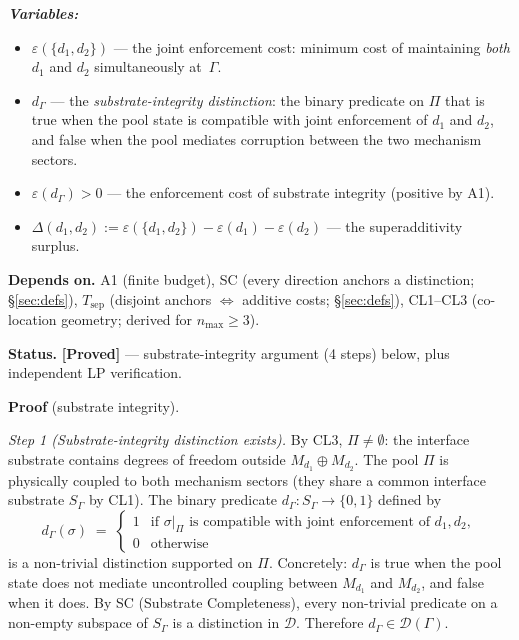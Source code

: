\documentclass[11pt]{article}
\theoremstyle{remark}
\newenvironment{varlist}{\begin{itemize}[nosep,leftmargin=2em]}{\end{itemize}}
\begin{document}
\begin{tcolorbox}[apfbox, title={$L_{\Delta}$ (Competition): Superadditivity from Substrate Integrity}]
\smallskip\noindent\textbf{\textit{Variables:}}
\begin{varlist}
\item $\varepsilon(\{d_1, d_2\})$ --- the joint enforcement cost: minimum cost of maintaining \emph{both} $d_1$ and $d_2$ simultaneously at~$\Gamma$.
\item $d_\Gamma$ --- the \emph{substrate-integrity distinction}: the binary predicate on $\Pi$ that is true when the pool state is compatible with joint enforcement of $d_1$ and $d_2$, and false when the pool mediates corruption between the two mechanism sectors.
\item $\varepsilon(d_\Gamma) > 0$ --- the enforcement cost of substrate integrity (positive by A1).
\item $\Delta(d_1, d_2) := \varepsilon(\{d_1,d_2\}) - \varepsilon(d_1) - \varepsilon(d_2)$ --- the superadditivity surplus.
\end{varlist}

\smallskip\noindent\textbf{Depends on.}  A1 (finite budget), SC (every direction anchors a distinction; \S\ref{sec:defs}), $T_{\mathrm{sep}}$ (disjoint anchors $\Leftrightarrow$ additive costs; \S\ref{sec:defs}), CL1--CL3 (co-location geometry; derived for $n_{\max} \ge 3$).

\smallskip\noindent\textbf{Status.}  \textbf{[Proved]} --- substrate-integrity argument (4 steps) below, plus independent LP verification.

\smallskip\noindent\textbf{Proof} (substrate integrity).

\textit{Step 1 (Substrate-integrity distinction exists).}  By CL3, $\Pi \ne \emptyset$: the interface substrate contains degrees of freedom outside $M_{d_1} \oplus M_{d_2}$.  The pool $\Pi$ is physically coupled to both mechanism sectors (they share a common interface substrate $S_\Gamma$ by CL1).  The binary predicate $d_\Gamma: S_\Gamma \to \{0,1\}$ defined by
\[
d_\Gamma(\sigma) \;=\; 
\begin{cases}
1 & \text{if } \sigma|_\Pi \text{ is compatible with joint enforcement of } d_1, d_2, \\
0 & \text{otherwise}
\end{cases}
\]
is a non-trivial distinction supported on $\Pi$.  Concretely: $d_\Gamma$ is true when the pool state does not mediate uncontrolled coupling between $M_{d_1}$ and $M_{d_2}$, and false when it does.  By SC (Substrate Completeness), every non-trivial predicate on a non-empty subspace of $S_\Gamma$ is a distinction in $\mathcal{D}$.  Therefore $d_\Gamma \in \mathcal{D}(\Gamma)$.


\end{tcolorbox}
\end{document}
